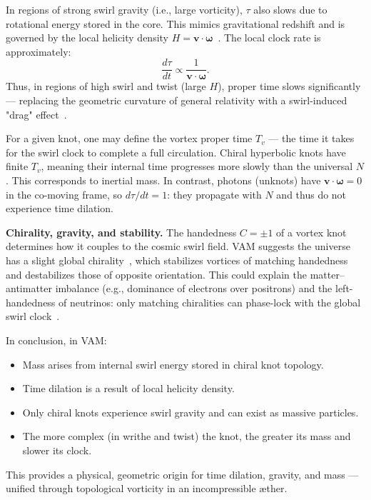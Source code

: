 In regions of strong swirl gravity (i.e., large vorticity), $\tau$ also slows due to rotational energy stored in the core. This mimics gravitational redshift and is governed by the local helicity density $H = \mathbf{v} \cdot \boldsymbol{\omega}$~\cite{iskandarani2025vam5}. The local clock rate is approximately:
\[
\frac{d\tau}{dt} \propto \frac{1}{\mathbf{v} \cdot \boldsymbol{\omega}}.
\]
Thus, in regions of high swirl and twist (large $H$), proper time slows significantly — replacing the geometric curvature of general relativity with a swirl-induced "drag" effect~\cite{iskandarani2025vam5}.

For a given knot, one may define the vortex proper time $T_v$ — the time it takes for the swirl clock to complete a full circulation. Chiral hyperbolic knots have finite $T_v$, meaning their internal time progresses more slowly than the universal $N$. This corresponds to inertial mass. In contrast, photons (unknots) have $\mathbf{v} \cdot \boldsymbol{\omega} = 0$ in the co-moving frame, so $d\tau/dt = 1$: they propagate with $N$ and thus do not experience time dilation.

\textbf{Chirality, gravity, and stability.} The handedness $C = \pm 1$ of a vortex knot determines how it couples to the cosmic swirl field. VAM suggests the universe has a slight global chirality~\cite{iskandarani2025vam5}, which stabilizes vortices of matching handedness and destabilizes those of opposite orientation. This could explain the matter–antimatter imbalance (e.g., dominance of electrons over positrons) and the left-handedness of neutrinos: only matching chiralities can phase-lock with the global swirl clock~\cite{iskandarani2025vam5}.

In conclusion, in VAM:
\begin{itemize}
  \item Mass arises from internal swirl energy stored in chiral knot topology.
  \item Time dilation is a result of local helicity density.
  \item Only chiral knots experience swirl gravity and can exist as massive particles.
  \item The more complex (in writhe and twist) the knot, the greater its mass and slower its clock.
\end{itemize}

This provides a physical, geometric origin for time dilation, gravity, and mass — unified through topological vorticity in an incompressible æther.

